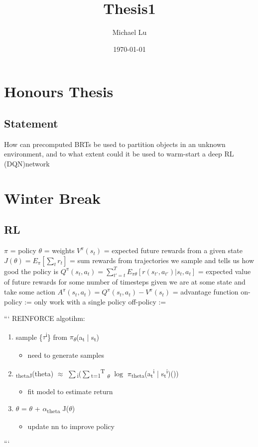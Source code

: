\documentclass[11pt]{article}
\author{Michael Lu}
\date{\today}
\title{Thesis1}
\begin{document}
\maketitle
\tableofcontents


\section{Honours Thesis}
\label{sec:orgf49f859}
\subsection{Statement}
\label{sec:orgc89635e}
How can precomputed BRTs be used to partition objects in an unknown environment,
and to what extent could it be used to warm-start a deep RL (DQN)network

\section{Winter Break}
\label{sec:org9a201c2}
\subsection{RL}
\label{sec:org4f87140}
\(\pi\) = policy
\(\theta\) = weights
\(V^\pi(s_t)\) = expected future rewards from a given state
\(J(\theta) = E_\pi[\sum_t r_t]\) = sum rewards from trajectories we sample and tells us how good the policy is
\(Q^\pi(s_t, a_t) = \sum_{t' = t} ^T E_{\pi\theta}[r(s_{t'}, a_{t'}) | s_t, a_t]\) = expected value of future rewards for some number of timesteps given we are at some state and take some action
\(A^\pi(s_t, a_t) = Q^\pi(s_t, a_t) - V^\pi(s_t)\) = advantage function
on-policy := only work with a single policy
off-policy :=

```
REINFORCE algotihm:
\begin{enumerate}
\item sample \{\(\tau\)\textsuperscript{i}\} from \(\pi\)\textsubscript{\(\theta\)}(a\textsubscript{t} | s\textsubscript{t})
\begin{itemize}
\item need to generate samples
\end{itemize}
\item \grad\textsubscript{thetaJ}(theta) \(\approx\) \(\sum\)\textsubscript{i}(\(\sum\)\textsubscript{t=1}\textsuperscript{T} \grad\textsubscript{\(\theta\)} \(\log\) \(\pi\)\textsubscript{theta}(a\textsubscript{t}\textsuperscript{i} | s\textsubscript{t}\textsuperscript{i})())
\begin{itemize}
\item fit model to estimate return
\end{itemize}
\item \(\theta\)  = \(\theta\) + \(\alpha\)\grad\textsubscript{theta} J(\(\theta\))
\begin{itemize}
\item update nn to improve policy
\end{itemize}
\end{enumerate}
```
\end{document}

